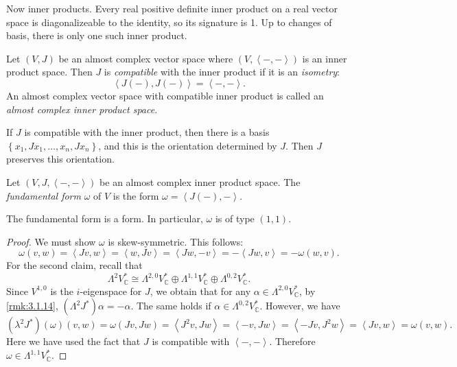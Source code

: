 Now inner products. Every real positive definite inner product on a real vector space is diagonalizeable to the identity, so its signature is 1. Up to changes of basis, there is only one such inner product.

\begin{definition}\label{dfn:3.1.16}
	Let $(V,J)$ be an almost complex vector space where $(V,\left\langle -,- \right\rangle )$ is an inner product space. Then $J$ is \emph{compatible} with the inner product if it is an \emph{isometry}:
	\[
		\left\langle J(-),J(-) \right\rangle =\left\langle -,- \right\rangle 
	.\]
	An almost complex vector space with compatible inner product is called an \emph{almost complex inner product space}.
\end{definition}


\begin{remark}\label{rmk:3.1.17}
If $J$ is compatible with the inner product, then there is a basis $\left\{ x_1, Jx_1, \ldots ,x_n,Jx_n \right\} $, and this is the orientation determined by $J$. Then $J$ preserves this orientation.
\end{remark}

\begin{definition}\label{dfn:3.1.18}
	Let $(V,J,\left\langle -,- \right\rangle )$ be an almost complex inner product space. The \emph{fundamental form} $\omega $ of $V$ is the form $\omega =\left\langle J(-),- \right\rangle $.
\end{definition}
\begin{lemma}\label{lma:3.1.19}
	The fundamental form is a form. In particular, $\omega $ is of type $(1,1)$.
\end{lemma}
\begin{proof}
	We must show $\omega $ is skew-symmetric. This follows:
	\[
		\omega (v,w) = \left\langle Jv,w \right\rangle =\left\langle w,Jv \right\rangle =\left\langle Jw,-v \right\rangle =-\left\langle Jw,v \right\rangle =-\omega (w,v)
	.\]
	For the second claim, recall that
	\[
		\Lambda ^2V^*_\mathbb{C} \cong \Lambda ^{2,0} V^*_\mathbb{C} \oplus \Lambda ^{1,1} V^*_\mathbb{C} \oplus \Lambda ^{0,2} V^*_\mathbb{C} 
	.\]
	Since $V^{1,0} $ is the $i$-eigenspace for $J$, we obtain that for any $\alpha \in \Lambda ^{2,0} V_\mathbb{C} ^*$, by \cref{rmk:3.1.14}, $(\Lambda ^2J^*)\alpha =-\alpha $. The same holds if $\alpha \in \Lambda ^{0,2} V_\mathbb{C} ^*$. However, we have
	\[
		(\lambda ^2J^*)(\omega )(v,w)=\omega (Jv,Jw)=\left\langle J^2v,Jw \right\rangle =\left\langle -v,Jw \right\rangle =\left\langle -Jv,J^2w \right\rangle =\left\langle Jv,w \right\rangle =\omega (v,w)
	.\]
	Here we have used the fact that $J$ is compatible with $\left\langle -,- \right\rangle $. Therefore $\omega \in \Lambda ^{1,1} V_\mathbb{C} ^*$.
\end{proof}


